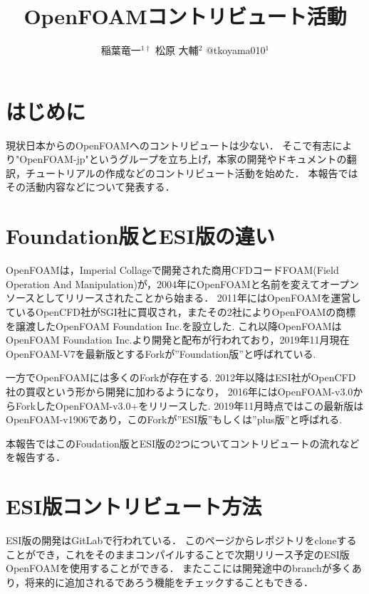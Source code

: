 \documentclass{ltjoc}
\title{OpenFOAMコントリビュート活動}
\author{%
稲葉竜一$^{1\dagger}$%
\hspace{1\zw}%
松原 大輔$^{2}$%
\hspace{1\zw}%
@tkoyama010$^{1}$%
}
\affiliation{%
${}^{1}$OpenFOAM-jp%
\hspace{1\zw}%
${}^{2}$オープン CAE勉強会%
}
\begin{document}
\maketitle
\section{はじめに}
現状日本からのOpenFOAMへのコントリビュートは少ない．
そこで有志により"OpenFOAM-jp"というグループを立ち上げ，本家の開発やドキュメントの翻訳，チュートリアルの作成などのコントリビュート活動を始めた．
本報告ではその活動内容などについて発表する．
\section{Foundation版とESI版の違い}
OpenFOAMは，Imperial Collageで開発された商用CFDコードFOAM(Field Operation And Manipulation)が，2004年にOpenFOAMと名前を変えてオープンソースとしてリリースされたことから始まる．\cite{URL:openfoam.history}\cite{Minabe:OpenCAE2015-GP23}
2011年にはOpenFOAMを運営しているOpenCFD社がSGI社に買収され，またその2社によりOpenFOAMの商標を譲渡したOpenFOAM Foundation Inc.を設立した.
これ以降OpenFOAMはOpenFOAM Foundation Inc.より開発と配布が行われており，2019年11月現在OpenFOAM-V7を最新版とするForkが”Foundation版”\cite{URL:openfoam.org}\cite{URL:GitHub-foundation}と呼ばれている.

一方でOpenFOAMには多くのForkが存在する.
2012年以降はESI社がOpenCFD社の買収という形から開発に加わるようになり，
2016年にはOpenFOAM-v3.0からForkしたOpenFOAM-v3.0+をリリースした.
2019年11月時点ではこの最新版はOpenFOAM-v1906であり，このForkが”ESI版”\cite{URL:openfoam.com}\cite{URL:GitLab-plus}もしくは”plus版”と呼ばれる.

本報告ではこのFoudation版とESI版の2つについてコントリビュートの流れなどを報告する．
%
\section{ESI版コントリビュート方法}
ESI版の開発はGitLabで行われている．\cite{URL:GitLab-plus}
このページからレポジトリをcloneすることができ，これをそのままコンパイルすることで次期リリース予定のESI版OpenFOAMを使用することができる．
またここには開発途中のbranchが多くあり，将来的に追加されるであろう機能をチェックすることもできる．
\end{document}
